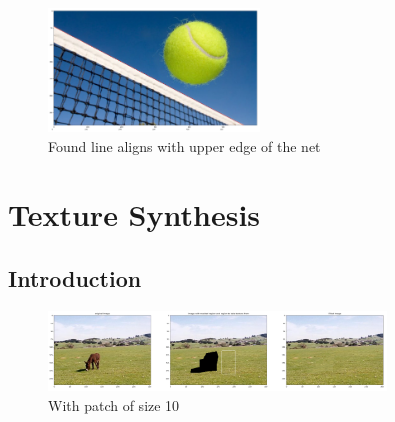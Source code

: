 \documentclass[12pt]{article}
\begin{document}
\begin{figure}[!htb]
    \centering
    \includegraphics[width=0.5\textwidth]{pics/tennis}
    \caption{Found line aligns with upper edge of the net}
    \end{figure}

\pagebreak

\section{Texture Synthesis}
\subsection{Introduction}


\begin{figure}[!htb]
    \centering
    \includegraphics[width=0.8\textwidth]{pics/donkey10}
    \caption{With patch of size 10}
    \label{fig:boxfilter}
    \end{figure}
\end{document}
